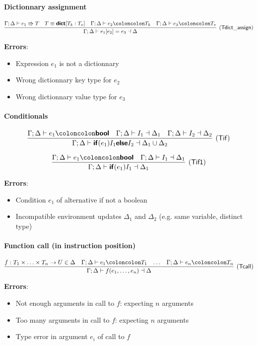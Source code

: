 \documentclass[a4paper]{article}
\newcommand{\kw}[1]{\textsf{\textbf{#1}}}
\newcommand{\colcol}{\coloncolon}
\newcommand{\yield}{\Rrightarrow}
\newcommand{\fun}[1]{\mathsf{#1}}
\begin{document}
\paragraph{Dictionnary assignment}

$$
\infer[(\fun{Tdict\_assign})]{\Gamma;\Delta \vdash e_1[e_2] = e_3 \dashv \Delta}
{\Gamma;\Delta \vdash e_1 \yield T & T \equiv \kw{dict}[T_k:T_v] & \Gamma;\Delta \vdash e_2 \colcol T_k & \Gamma;\Delta \vdash e_3 \colcol T_v}
$$

\textbf{Errors}:
\begin{itemize}
\item Expression $e_1$ is not a dictionnary
\item Wrong dictionnary key type for $e_2$
\item Wrong dictionnary value type for $e_3$
\end{itemize}

\paragraph{Conditionals}

$$
\infer[(\fun{Tif})]{\Gamma;\Delta \vdash \kw{if} (e_1) I_1 \kw{else} I_2 \dashv \Delta_1 \cup \Delta_2}
{\Gamma;\Delta \vdash e_1 \colcol \kw{bool} & \Gamma;\Delta \vdash I_1 \dashv \Delta_1 &  \Gamma;\Delta \vdash I_2 \dashv \Delta_2}
$$

$$
\infer[(\fun{Tif1})]{\Gamma;\Delta \vdash \kw{if} (e_1) I_1 \dashv \Delta_1}
{\Gamma;\Delta \vdash e_1 \colcol \kw{bool} & \Gamma;\Delta \vdash I_1 \dashv \Delta_1}
$$

\textbf{Errors}:
\begin{itemize}
\item Condition $e_1$ of alternative if not a boolean
\item Incompatible environment updates $\Delta_1$ and $\Delta_2$  (e.g. same variable, distinct type)
\end{itemize}

\paragraph{Function call (in instruction position)}

$$
\infer[(\fun{Tcall})]{\Gamma ; \Delta \vdash f(e_1,\ldots,e_n) \dashv \Delta}
{f:T_1\times \ldots \times T_n \rightarrow U \in \Delta & \Gamma;\Delta \vdash e_1 \colcol T_1 & \ldots &  \Gamma;\Delta \vdash e_n \colcol T_n}
$$

\textbf{Errors}:
\begin{itemize}
\item Not enough arguments in call to $f$: expecting $n$ arguments
\item Too many arguments in call to $f$: expecting $n$ arguments
\item Type error in argument $e_i$ of call to $f$
\end{itemize}
\end{document}
